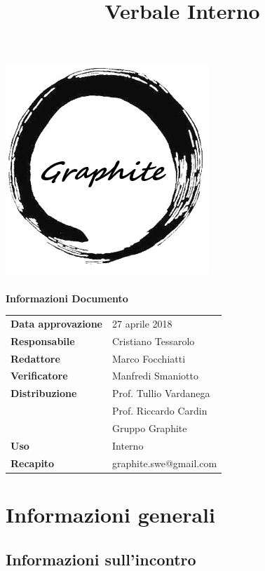 \documentclass[openany,12pt,a4paper]{article}
\title{Verbale Interno}
\author{}
\begin{document}
	\makeatletter
	\begin{titlepage}
		\setlength{\headsep}{0pt}  
		\begin{center}
			\includegraphics[width=0.5\linewidth]{Logo.png}\\[1em]
			{\huge \bfseries  \@title }\\[10ex]
			\textbf{\Large Informazioni Documento} \\[2em]
			\bgroup
			\def\arraystretch{1.5}
			\begin{tabular}{l|l}
				\textbf{Data approvazione} & 27 aprile 2018 \\
				\textbf{Responsabile} & Cristiano Tessarolo \\
				\textbf{Redattore} & Marco Focchiatti \\
				\textbf{Verificatore} & Manfredi Smaniotto \\
				\textbf{Distribuzione} & Prof. Tullio Vardanega \\
				 & Prof. Riccardo Cardin \\
				 & Gruppo Graphite \\
				\textbf{Uso} & Interno \\
				\textbf{Recapito} & graphite.swe@gmail.com \\
			\end{tabular}
		\egroup
		\end{center}
	\end{titlepage}
	\makeatother

	\thispagestyle{empty}
	\newpage
	
	\tableofcontents
	\newpage
	
	\section{Informazioni generali}
	
	\subsection{Informazioni sull'incontro}
	
\end{document}
